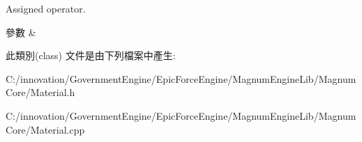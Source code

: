 Assigned operator. 


\begin{DoxyParams}{參數}
{\em } & \\
\hline
\end{DoxyParams}


此類別(class) 文件是由下列檔案中產生\+:\begin{DoxyCompactItemize}
\item 
C\+:/innovation/\+Government\+Engine/\+Epic\+Force\+Engine/\+Magnum\+Engine\+Lib/\+Magnum\+Core/Material.\+h\item 
C\+:/innovation/\+Government\+Engine/\+Epic\+Force\+Engine/\+Magnum\+Engine\+Lib/\+Magnum\+Core/Material.\+cpp\end{DoxyCompactItemize}
